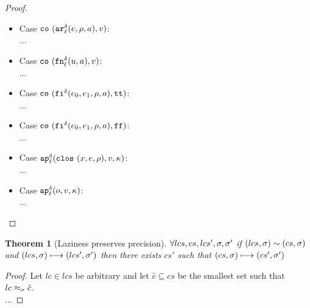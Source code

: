 \documentclass[preprint,onecolumn,9pt]{sigplanconf} %
\newtheorem{theorem}{Theorem}
\begin{document}
\begin{proof}
\begin{itemize}
\item{Case $\co{\kar[^\mcntr_\mlab]{\mexp, \menv, \maddr}, \mval}$: \\
      ...}
\item{Case $\co{\kfn[^\mcntr_\mlab]{\mvalx{u}, \maddr}, \mval}$: \\
      ...}
\item{Case $\co{\kif[^\mcntr]{\mexp_0, \mexp_1, \menv, \maddr}, \strue}$: \\
      ...}
\item{Case $\co{\kif[^\mcntr]{\mexp_0, \mexp_1, \menv, \maddr}, \sfalse}$: \\
      ...}
\item{Case $\ap[^\mcntr_\mlab]{\clos{\mvar, \mexp, \menv}, \mval, \mkont}$: \\
      ...}
\item{Case $\ap[^\mcntr_\mlab]{\mop, \mval, \mkont}$: \\
      ...}
\end{itemize}
\end{proof}


\begin{theorem}[Laziness preserves precision]
$\forall lcs,cs,lcs',\msto,\msto'$ if $\capprx{(lcs, \msto)}{(cs,\msto)}$
  and $(lcs,\msto) \machstep (lcs',\msto')$ then there exists $cs'$
  such that $(cs,\msto) \machstep (cs',\msto')$
\end{theorem}
\begin{proof}
Let $lc \in lcs$ be arbitrary and let $\hat{c} \subseteq cs$ be the
smallest set such that $\lapprx{lc}{\msto}{\hat{c}}$. \\
...
\end{proof}


\end{document}
